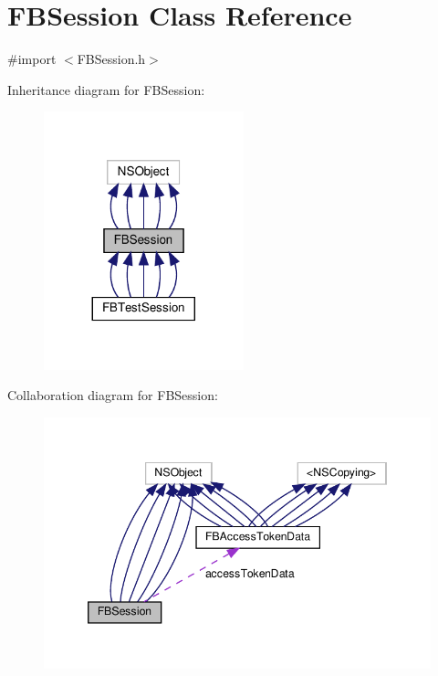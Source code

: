 \hypertarget{interfaceFBSession}{}\section{F\+B\+Session Class Reference}
\label{interfaceFBSession}


{\ttfamily \#import $<$F\+B\+Session.\+h$>$}



Inheritance diagram for F\+B\+Session\+:
\nopagebreak
\begin{figure}[H]
\begin{center}
\leavevmode
\includegraphics[width=164pt]{interfaceFBSession__inherit__graph}
\end{center}
\end{figure}


Collaboration diagram for F\+B\+Session\+:
\nopagebreak
\begin{figure}[H]
\begin{center}
\leavevmode
\includegraphics[width=346pt]{interfaceFBSession__coll__graph}
\end{center}
\end{figure}
